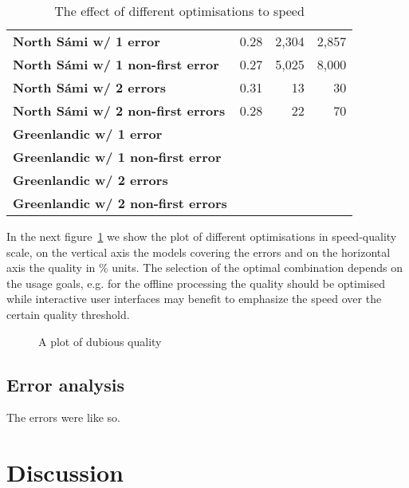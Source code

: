 \documentclass[a4paper,12pt]{article}
\begin{document}
\begin{table}
\begin{tabular}{|l|r|r|r|}
        \bf North Sámi w/ 1 error    & 0.28 & 2,304 & 2,857 \\
\bf North Sámi w/ 1 non-first error  & 0.27 & 5,025 & 8,000 \\
       \bf North Sámi w/ 2 errors    & 0.31 & 13    & 30    \\
\bf North Sámi w/ 2 non-first errors & 0.28 & 22    & 70    \\
        \hline
        \bf Greenlandic w/ 1 error    & & & \\
\bf Greenlandic w/ 1 non-first error  & & & \\
       \bf Greenlandic w/ 2 errors    & & & \\
\bf Greenlandic w/ 2 non-first errors & & & \\
        \hline
    \end{tabular}
    \caption{The effect of different optimisations to speed
    \label{table:optimisation-speed}}
\end{table}

In the next figure~\ref{fig:optimisation-speed-quality} we show the plot of
different optimisations in speed-quality scale, on the vertical axis the models
covering the errors and on the horizontal axis the quality in \% units. The
selection of the optimal combination depends on the usage goals, e.g. for the
offline processing the quality should be optimised while interactive user
interfaces may benefit to emphasize the speed over the certain quality
threshold.

\begin{figure}
    \centering
    \caption{A plot of dubious quality
    \label{fig:optimisation-speed-quality}}
\end{figure}

\subsection{Error analysis}
\label{subsec:error-analysis}


The errors were like so.

\section{Discussion}
\label{sec:discussion}
\end{document}

